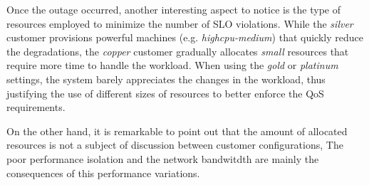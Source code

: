 Once the outage occurred, another interesting aspect to notice is the type of resources employed to minimize the number of SLO violations. While the \emph{silver} customer provisions powerful machines (e.g. \emph{highcpu-medium}) that quickly reduce the degradations, the \emph{copper} customer gradually allocates \emph{small} resources that require more time to handle the workload. When using the \emph{gold} or \emph{platinum} settings, the system barely appreciates the changes in the workload, thus justifying the use of different sizes of resources to better enforce the QoS requirements. 

On the other hand, it is remarkable to point out that the amount of allocated resources is not a subject of discussion between customer configurations, The poor performance isolation and the network bandwitdth are mainly the consequences of this performance variations.




